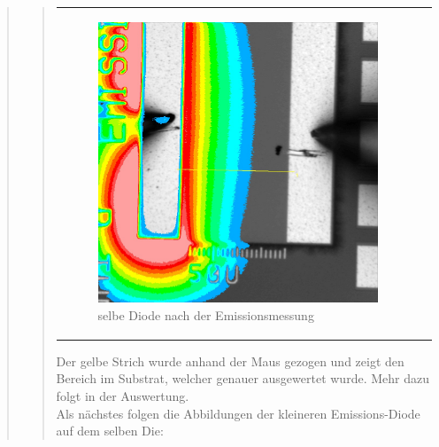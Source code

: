 \begin{quote}
\begin{quote}
\begin{center}
\begin{tabular}{ll}
\begin{minipage}{0.6\textwidth}
                         \begin{figure}[H]
                            \label{fig:}
                            \includegraphics[scale=0.25, trim = 0cm 0cm 0cm
                            0cm,
                            clip]{./Emissionsbilder/eins/nach_Emission_mit_Distanzen.jpg}
                            \caption{selbe Diode nach der Emissionsmessung}
                        \end{figure}
                   \vspace{-1.5em}
    
                    \end{minipage}
    
                \end{tabular}
                \end{center}
                
        \vspace{2em}
        
        Der gelbe Strich wurde anhand der Maus gezogen und zeigt den Bereich im
        Substrat, welcher genauer ausgewertet wurde. Mehr dazu folgt in der
        Auswertung.\\
        
        Als nächstes folgen die Abbildungen der kleineren Emissions-Diode auf
        dem selben Die:
             

\end{quote}
\end{quote}
